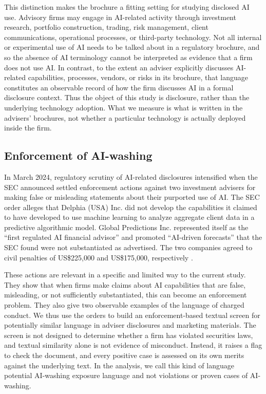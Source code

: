 \documentclass[utf8]{FrontiersinHarvard}
\begin{document}
This distinction makes the brochure a fitting setting for studying disclosed AI use. Advisory firms may engage in AI-related activity through investment research, portfolio construction, trading, risk management, client communications, operational processes, or third-party technology. Not all internal or experimental use of AI needs to be talked about in a regulatory brochure, and so the absence of AI terminology cannot be interpreted as evidence that a firm does not use AI. In contrast, to the extent an adviser explicitly discusses AI-related capabilities, processes, vendors, or risks in its brochure, that language constitutes an observable record of how the firm discusses AI in a formal disclosure context. Thus the object of this study is disclosure, rather than the underlying technology adoption. What we measure is what is written in the advisers' brochures, not whether a particular technology is actually deployed inside the firm.

\subsection{Enforcement of AI-washing}

In March 2024, regulatory scrutiny of AI-related disclosures intensified when the SEC announced settled enforcement actions against two investment advisers for making false or misleading statements about their purported use of AI. The SEC order alleges that Delphia (USA) Inc. did not develop the capabilities it claimed to have developed to use machine learning to analyze aggregate client data in a predictive algorithmic model. Global Predictions Inc. represented itself as the ``first regulated AI financial advisor'' and promoted ``AI-driven forecasts'' that the SEC found were not substantiated as advertised. The two companies agreed to civil penalties of US\$225{,}000 and US\$175{,}000, respectively \citep{usSEC2024a,usSEC2024b}.

These actions are relevant in a specific and limited way to the current study. They show that when firms make claims about AI capabilities that are false, misleading, or not sufficiently substantiated, this can become an enforcement problem. They also give two observable examples of the language of charged conduct. We thus use the orders to build an enforcement-based textual screen for potentially similar language in adviser disclosures and marketing materials. The screen is not designed to determine whether a firm has violated securities laws, and textual similarity alone is not evidence of misconduct. Instead, it raises a flag to check the document, and every positive case is assessed on its own merits against the underlying text. In the analysis, we call this kind of language potential AI-washing exposure language and not violations or proven cases of AI-washing.
\end{document}
